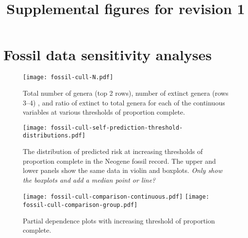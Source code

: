 \documentclass[11pt]{article}
\title{Supplemental figures for revision 1}
\author{}
\begin{document}
\maketitle

\section{Fossil data sensitivity analyses}



\begin{figure}[htbp]
\begin{center}
\texttt{[image: fossil-cull-N.pdf]}
\caption{Total number of genera (top 2 rows), number of extinct genera (rows 3--4) , and ratio of extinct to total genera for each of the continuous variables at various thresholds of proportion complete.}
\label{fig:raw-predictor-paleo-culls}
\end{center}
\end{figure}

\clearpage



\begin{figure}[htbp]
\begin{center}
\texttt{[image: fossil-cull-self-prediction-threshold-distributions.pdf]}
\caption{The distribution of predicted risk at increasing thresholds of proportion complete in the Neogene fossil record. The upper and lower panels show the same data in violin and boxplots. \textit{Only show the boxplots and add a median point or line?}}
\label{fig:ext-boxplots-paleo-culls}
\end{center}
\end{figure}

\clearpage

\begin{figure}[htbp]
\begin{center}
\texttt{[image: fossil-cull-comparison-continuous.pdf]}
\texttt{[image: fossil-cull-comparison-group.pdf]}
\caption{Partial dependence plots with increasing threshold of proportion complete.}
\label{fig:partial-paleo-culls}
\end{center}
\end{figure}
\end{document}
